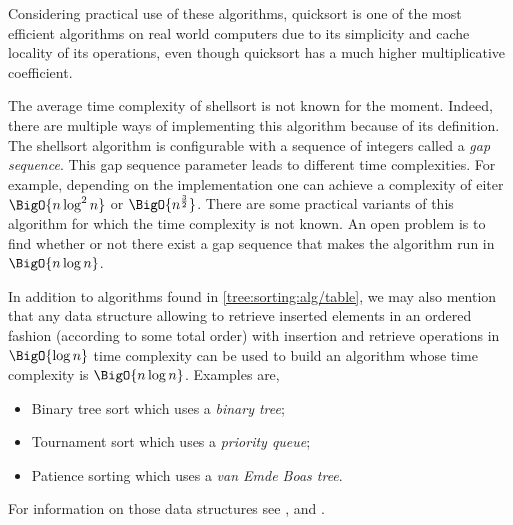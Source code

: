 Considering practical use of these algorithms, quicksort is one of the most efficient algorithms on real world computers due to its simplicity and cache locality of its operations, even though quicksort has a much higher multiplicative coefficient.

The average time complexity of shellsort is not known for the moment. Indeed, there are multiple ways of implementing this algorithm because of its definition. The shellsort algorithm is configurable with a sequence of integers called a \emph{gap sequence}. This gap sequence parameter leads to different time complexities. For example, depending on the implementation one can achieve a complexity of eiter $\BigO{n \log^2 n}$ or $\BigO{n^{\frac{3}{2}}}$. There are some practical variants of this algorithm for which the time complexity is not known. An open problem is to find whether or not there exist a gap sequence that makes the algorithm run in $\BigO{n \log n}$.

In addition to algorithms found in \ref{tree:sorting:alg/table}, we may also mention that any data structure allowing to retrieve inserted elements in an ordered fashion (according to some total order) with insertion and retrieve operations in $\BigO{\log n}$ time complexity can be used to build an algorithm whose time complexity is $\BigO{n \log n}$. Examples are,

\begin{itemize}
\item Binary tree sort which uses a \emph{binary tree};
\item Tournament sort which uses a \emph{priority queue};
\item Patience sorting which uses a \emph{van Emde Boas tree}.
\end{itemize}

For information on those data structures see \cite{sleator1985self}, \cite{leiserson2001introduction} and \cite{van1975preserving}.